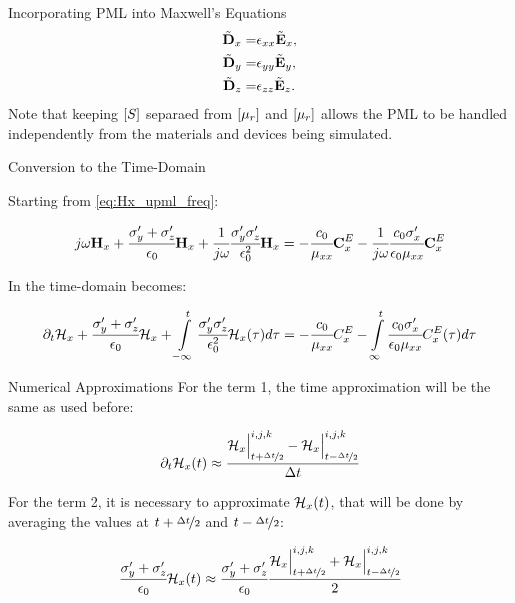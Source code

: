 \documentclass{beamer}
\begin{document}
\begin{frame}{Incorporating PML into Maxwell's Equations}
  \begin{align}
    \tilde{\textbf{D}}_x =& \epsilon_{xx} \tilde{\textbf{E}}_x, \\
    \tilde{\textbf{D}}_y =& \epsilon_{yy} \tilde{\textbf{E}}_y, \\
    \tilde{\textbf{D}}_z =& \epsilon_{zz} \tilde{\textbf{E}}_z. 
  \end{align}
  Note that keeping $\brackets{S}$ separaed from $\brackets{\mu_r}$ and $\brackets{\mu_r}$ allows the PML to be handled independently from the materials and devices being simulated.
\end{frame}


\begin{frame}{Conversion to the Time-Domain}

  
  Starting from \eqref{eq:Hx_upml_freq}:


  \begin{align}
    j\omega \textbf{H}_x + \cfrac{\sigma_y^{\prime} + \sigma_z^{\prime}}{\epsilon_0}\textbf{H}_x + \cfrac{1}{j\omega}\cfrac{\sigma_y^{\prime}\sigma_z^{\prime}}{\epsilon_0^2}\textbf{H}_x
    = -\cfrac{c_0}{\mu_{xx}}\textbf{C}_x^E - \cfrac{1}{j\omega}\cfrac{c_0\sigma_x^{\prime}}{\epsilon_0\mu_{xx}}\textbf{C}_x^E
  \end{align}

  In the time-domain becomes:

  \begin{align}
    \partial_t\mathcal{H}_x + \cfrac{\sigma_y^{\prime} + \sigma_z^{\prime}}{\epsilon_0}\mathcal{H}_x + \int\limits_{-\infty}^t\cfrac{\sigma_y^{\prime}\sigma_z^{\prime}}{\epsilon_0^2}\mathcal{H}_x(\tau)d\tau
    = -\cfrac{c_0}{\mu_{xx}}C_x^E - \int\limits_{\infty}^t\cfrac{c_0\sigma_x^{\prime}}{\epsilon_0\mu_{xx}}C_x^E(\tau)d\tau
    \label{eq:Hx_upml_time}
  \end{align}

\end{frame}

\begin{frame}{Numerical Approximations}
  For the term 1, the time approximation will be the same as used before:

\begin{align}
    \partial_t\mathcal{H}_x(t) \approx \cfrac{\mathcal{H}_x\Big|_{t+\nicefrac{\Delta t}{2}}^{i,j,k}-\mathcal{H}_x\Big|^{i,j,k}_{t-\nicefrac{\Delta t}{2}}}{\Delta t}
\end{align}

For the term 2, it is necessary to approximate $\mathcal{H}_x(t)$, that will be done by averaging the values at $t + \nicefrac{\Delta t}{2}$ and $t - \nicefrac{\Delta t}{2}$:

\begin{align}
    \cfrac{\sigma_y^{\prime} + \sigma_z^{\prime}}{\epsilon_0}\mathcal{H}_x(t)\approx
    \cfrac{\sigma_y^{\prime} + \sigma_z^{\prime}}{\epsilon_0}\cfrac{\mathcal{H}_x\Big|_{t+\nicefrac{\Delta t}{2}}^{i,j,k}+\mathcal{H}_x\Big|^{i,j,k}_{t-\nicefrac{\Delta t}{2}}}{2}
\end{align}
\end{frame}
\end{document}
